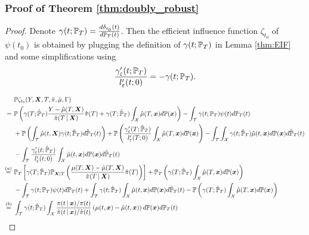 \subsubsection{Proof of Theorem \ref{thm:doubly_robust}}
\begin{proof}
Denote $\gamma(t;\P_T)=\frac{d\delta_{t_0}(t)}{d\P_T(t)}$.
Then the efficient influence function $\zeta_{t_0}$ of $\psi(t_0)$ is obtained by plugging the definition of $\gamma(t;\P_T)$ in Lemma \ref{thm:EIF} and some simplifications using 
\begin{equation}\label{appendix_eq:gamma_epsilon}
    \frac{\gamma'_{\varepsilon}(t; \P_T)}{l'_{\varepsilon}(t;0)}=-\gamma(t; \P_T).
\end{equation}



\iffalse
\begin{equation}\label{eq_appendix:doubly_robust_final}
    \begin{split}
        &\P\zeta_{t_0}(Y,\X,T,\hat\pi,\hat \mu,\Gamma)
        \\=\,\, &\P\left(\gamma(T;\hat \P_T)\frac{Y-\hat \mu(T,\X)}{\hat \pi(T\C \X)}\hat\pi(T)+\gamma(T;\hat \P_T)\int_{\mathcal{X}}\hat \mu(T,\x)d\P(\x)\right)
        -\int_{\mathcal{T}}\gamma(t;\P_T)\psi(t)d\P_T(t)
        \\&+\P\left(\int_{\mathcal{T}}\hat \mu(t,\X)\gamma(t;\hat \P_T)d\hat \P_T(t)\right)
        +\P\left(\frac{\gamma'_{\varepsilon}(T;\hat \P_T)}{l'_{\varepsilon}(T;0)}\int_{\mathcal{X}}\hat \mu(T,\x)d\P(\x)\right)
        -\int_{\mathcal{T}}\int_{\mathcal{X}}\gamma(t;\hat \P_T)\hat \mu(t,\x)d\P(\x)d\hat \P_T(t)
        \\&-\int_{\mathcal{T}}\frac{\gamma'_{\varepsilon}(t;\hat \P_T)}{l'_{\varepsilon}(t;0)}\int_{\mathcal{X}}\hat \mu(t,\x)d\P(\x)d\hat \P_T(t)
        \\\stackrel{(a)}{=}\,\,&
        \P_T\left[\gamma(T;\hat \P_T)\P_{\X|T}\left(\frac{\mu(T,\X)-\hat \mu(T,\X)}{\hat \pi(T\C \X)}\hat\pi(T)\right)\right]
        +\P_T\left(\gamma(T;\hat \P_T)\int_{\mathcal{X}}\hat \mu(T,\x)d\P(\x)\right)
        \\&-\int_{\mathcal{T}}\gamma(t;\P_T)\psi(t)d\P_T(t) 
        +\int_{\mathcal{T}}\gamma(t;\hat \P_T)\int_{\mathcal{X}}\hat \mu(t,\x)d\P(\x)d\hat \P_T(t)
        -\P\left(\gamma(T;\hat \P_T)\int_{\mathcal{X}}\hat \mu(T,\x)d\P(\x)\right)
        \\\stackrel{(b)}{=}\,\,&
        \int_{\mathcal{T}}\gamma(t;\hat \P_T)\int_{\mathcal{X}}\frac{\pi(t\C \x)/\pi(t)}{\hat\pi(t\C \x)/\hat\pi(t)}\left(\mu(t,\x)-\hat \mu(t,\x)\right)d\P(\x)d\P_T(t)

\end{split}
\end{equation}
\end{proof}
